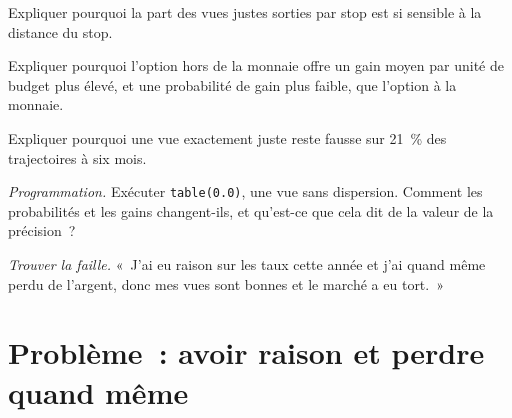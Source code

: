 \begin{exercise}[$\star\star$]\label{exo:s2:discretionary-macro:4}
Expliquer pourquoi la part des vues justes sorties par stop est si sensible à la distance du stop.
\end{exercise}

\begin{exercise}[$\star\star$]\label{exo:s2:discretionary-macro:5}
Expliquer pourquoi l'option hors de la monnaie offre un gain moyen par unité de budget plus élevé, et une probabilité de gain plus faible, que l'option à la monnaie.
\end{exercise}

\begin{exercise}[$\star\star$]\label{exo:s2:discretionary-macro:6}
Expliquer pourquoi une vue exactement juste reste fausse sur 21~\% des trajectoires à six mois.
\end{exercise}

\begin{exercise}[$\star\star\star$]\label{exo:s2:discretionary-macro:7}
\emph{Programmation.} Exécuter \texttt{table(0.0)}, une vue sans dispersion. Comment les probabilités et les gains changent-ils, et qu'est-ce que cela dit de la
valeur de la précision~?
\end{exercise}

\begin{exercise}[$\star\star\star$]\label{exo:s2:discretionary-macro:8}
\emph{Trouver la faille.} «~J'ai eu raison sur les taux cette année et j'ai quand même perdu de l'argent, donc mes vues sont bonnes et le marché a eu tort.~»
\end{exercise}

\section{Problème~: avoir raison et perdre quand même}

